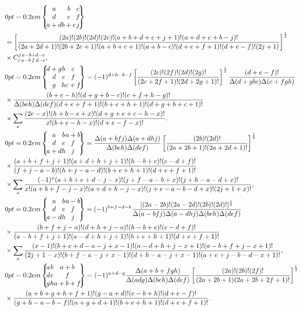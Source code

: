 \begin{align}
& \ninej{a}{b}{c}{d}{e}{f}{a+d}{b+e}{j}  \notag\\
& =\left[\frac{(2 a)!(2 b)!(2 d)!(2 e)!(a+b+d+e+j+1)!(a+d+e+b-j)!}{(2 a+2 d+1)!(2 b+2 e+1)!(a+b+c+1)!(a+b-c)!(d+e+f+1)!(d+e-f)!(2 j+1)}\right]^{\frac{1}{2}}  \notag\\
& \times \clebsch{c}{a-b}{f}{d-e}{j}{a-b+d-e},  \label{eq:10:8:9}\\
& \ninej{d+g}{b}{c}{d}{e}{f}{g}{h}{c+f}=(-1)^{d+h-b-f}\left[\frac{(2 c)!(2 f)!(2 d)!(2 g)!}{(2 c+2 f+1)!(2 d+2 g+1)!}\right]^{\frac{1}{2}} \frac{(d+e-f)!}{\Delta(d+g b c) \Delta(c+f g h)}  \notag\\
& \times \frac{(b+e-h)!(d+g+b-c)!(c+f+h-g)!}{\Delta(b e h) \Delta(d e f)(d+e+f+1)!(b+e+h+1)!(d+g+b+c+1)!}  \notag\\
& \times \sum_{x} \frac{(2 e-x)!(h+b-e+x)!(d+g+e+c-h-x)!}{x!(b+e-h-x)!(d+e-f-x)!} .  \label{eq:10:8:10}\\
& \ninej{a}{b}{a+b}{d}{e}{f}{a+d}{h}{j}=\frac{\Delta(a+b f j) \Delta(a+d h j)}{\Delta(b e h) \Delta(d e f)}\left[\frac{(2 b)!(2 d)!}{(2 a+2 b+1)!(2 a+2 d+1)!}\right]^{\frac{1}{2}}  \notag\\
& \times \frac{(a+b+f+j+1)!(a+d+h+j+1)!(h-b+e)!(e-d+f)!}{(f+j-a-b)!(h+j-a-d)!(b+e+h+1)!(d+e+f+1)!}  \notag\\
& \times \sum_{x} \frac{(-1)^{x}(a+b+e+d-j-x)!(j+f-a-b+x)!(j+h-a-d+x)!}{x!(a+b+f-j-x)!(a+d+h-j-x)!(j+e-a-b-d+x)!(2 j+1+x)!},  \label{eq:10:8:11}\\
& \ninej{a}{b}{a-b}{d}{e}{f}{a-d}{h}{j}=(-1)^{b+f-d-h} \frac{[(2 a-2 b)!(2 a-2 d)!(2 b)!(2 d)!]^{\frac{1}{2}}}{\Delta(a-b f j) \Delta(a-d h j) \Delta(b e h) \Delta(d e f)}  \notag\\
& \times \frac{(b+f+j-a)!(d+h+j-a)!(h-b+e)!(e-d+f)!}{(a-b+f+j+1)!(a-d+h+j+1)!(b+e+h+1)!(d+e+f+1)!}  \notag\\
& \times \sum_{x} \frac{(x-1)!(b+e+d-a-j+x-1)!(a-d+h+j-x+1)!(a-b+f+j-x+1)!}{(2 j+1-x)!(b+f-a-j+x-1)!(d+h-a-j+x-1)!(a+e+j-b-d-x+1)!},  \label{eq:10:8:12}\\
& \ninej{a}{b}{a+b}{d}{e}{f}{g}{h}{a+b+f}=(-1)^{a+d-g} \frac{\Delta(a+b+f g h)}{\Delta(a d g) \Delta(b e h) \Delta(d e f)}\left[\frac{(2 a)!(2 b)!(2 f)!}{(2 a+2 b+1)(2 a+2 b+2 f+1)!}\right]^{\frac{1}{2}}  \notag\\
& \times \frac{(a+b+g+h+f+1)!(g-a+d)!(e-b+h)!(d+e-f)!}{(g+h-a-b-f)!(a+g+d+1)!(b+e+h+1)!(d+e+f+1)!} . \label{eq:10:8:13}
\end{align}
